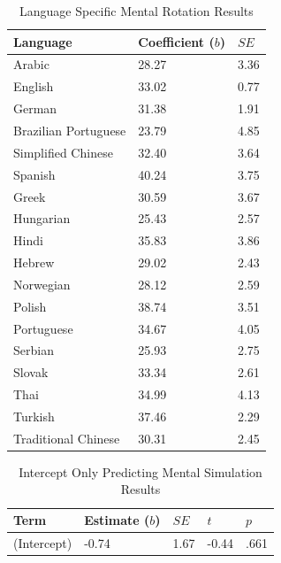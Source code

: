 \documentclass[
  man,floatsintext]{apa7}
\begin{document}
\begin{table}[tbp]

\begin{center}
\begin{threeparttable}

\caption{\label{tab:random_e}Language Specific Mental Rotation Results}

\begin{tabular}{lll}
\toprule
Language & Coefficient ($b$) & $SE$\\
\midrule
Arabic & 28.27 & 3.36\\
English & 33.02 & 0.77\\
German & 31.38 & 1.91\\
Brazilian Portuguese & 23.79 & 4.85\\
Simplified Chinese & 32.40 & 3.64\\
Spanish & 40.24 & 3.75\\
Greek & 30.59 & 3.67\\
Hungarian & 25.43 & 2.57\\
Hindi & 35.83 & 3.86\\
Hebrew & 29.02 & 2.43\\
Norwegian & 28.12 & 2.59\\
Polish & 38.74 & 3.51\\
Portuguese & 34.67 & 4.05\\
Serbian & 25.93 & 2.75\\
Slovak & 33.34 & 2.61\\
Thai & 34.99 & 4.13\\
Turkish & 37.46 & 2.29\\
Traditional Chinese & 30.31 & 2.45\\
\bottomrule
\end{tabular}

\end{threeparttable}
\end{center}

\end{table}

\begin{table}[tbp]

\begin{center}
\begin{threeparttable}

\caption{\label{tab:pred_intercept}Intercept Only Predicting Mental Simulation Results}

\begin{tabular}{lllll}
\toprule
Term & Estimate ($b$) & $SE$ & $t$ & $p$\\
\midrule
(Intercept) & -0.74 & 1.67 & -0.44 & .661\\
\bottomrule
\end{tabular}

\end{threeparttable}
\end{center}

\end{table}
\end{document}
